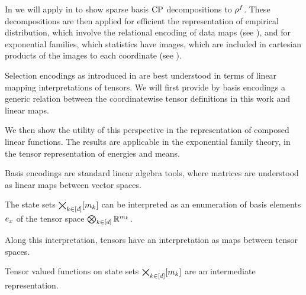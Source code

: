 In  we will apply  in  to show sparse basis $\mathrm{CP}$ decompositions to $\rho^{f}$.
These decompositions are then applied for efficient the representation of empirical distribution, which involve the relational encoding of data maps (see ), and for exponential families, which statistics have images, which are included in cartesian products of the images to each coordinate (see ).




Selection encodings as introduced in  are best understood in terms of linear mapping interpretations of tensors.
We will first provide by basis encodings a generic relation between the coordinatewise tensor definitions in this work and linear maps.

We then show the utility of this perspective in the representation of composed linear functions.
The results are applicable in the exponential family theory, in the tensor representation of energies and means.


Basis encodings are standard linear algebra tools, where matrices are understood as linear maps between vector spaces.

The state sets $\bigtimes_{k\in[d]}[m_{k}]$ can be interpreted as an enumeration of basis elements $e_{x}$ of the tensor space $\bigotimes_{k\in[d]} \mathbb{R}^{m_{k}}$.

Along this interpretation, tensors have an interpretation as maps between tensor spaces.


Tensor valued functions on state sets $\bigtimes_{k\in[d]}[m_{k}]$ are an intermediate representation.

